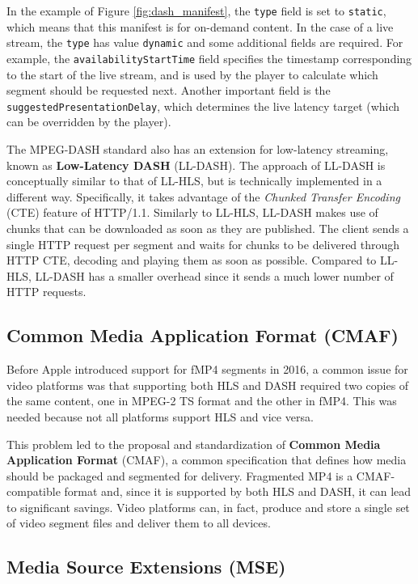 In the example of Figure \ref{fig:dash_manifest}, the \texttt{type} field is set to \texttt{static}, which means that this manifest is for on-demand content. In the case of a live stream, the \texttt{type} has value \texttt{dynamic} and some additional fields are required. For example, the \texttt{availabilityStartTime} field specifies the timestamp corresponding to the start of the live stream, and is used by the player to calculate which segment should be requested next. Another important field is the \texttt{suggestedPresentationDelay}, which determines the live latency target (which can be overridden by the player).

The MPEG-DASH standard also has an extension for low-latency streaming, known as \textbf{Low-Latency DASH} (LL-DASH). The approach of LL-DASH is conceptually similar to that of LL-HLS, but is technically implemented in a different way. Specifically, it takes advantage of the \textit{Chunked Transfer Encoding} (CTE) feature of HTTP/1.1. Similarly to LL-HLS, LL-DASH makes use of chunks that can be downloaded as soon as they are published. The client sends a single HTTP request per segment and waits for chunks to be delivered through HTTP CTE, decoding and playing them as soon as possible. Compared to LL-HLS, LL-DASH has a smaller overhead since it sends a much lower number of HTTP requests.\cite{llhls_vs_lldash}

\subsection{Common Media Application Format (CMAF)}
\label{sec:bg/technologies/cmaf}

Before Apple introduced support for fMP4 segments in 2016, a common issue for video platforms was that supporting both HLS and DASH required two copies of the same content, one in MPEG-2 TS format and the other in fMP4. This was needed because not all platforms support HLS and vice versa.

This problem led to the proposal and standardization of \textbf{Common Media Application Format} (CMAF), a common specification that defines how media should be packaged and segmented for delivery. Fragmented MP4 is a CMAF-compatible format and, since it is supported by both HLS and DASH, it can lead to significant savings. Video platforms can, in fact, produce and store a single set of video segment files and deliver them to all devices.\cite{cmaf}

\subsection{Media Source Extensions (MSE)}
\label{sec:bg/technologies/mse}

